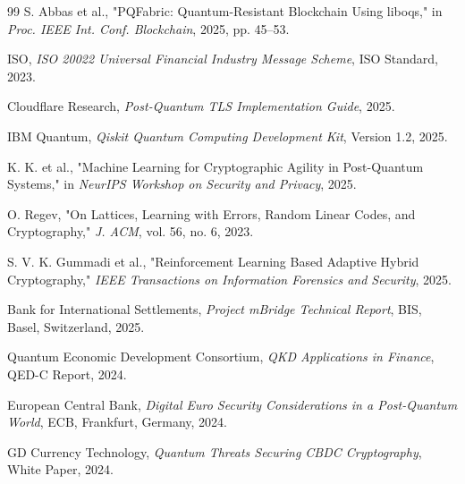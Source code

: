 \documentclass[pdflatex,sn-basic,english]{sn-jnl}
\begin{document}
\begin{thebibliography}{99}
S. Abbas et al., "PQFabric: Quantum-Resistant Blockchain Using liboqs," in \emph{Proc. IEEE Int. Conf. Blockchain}, 2025, pp. 45--53.

ISO, \emph{ISO 20022 Universal Financial Industry Message Scheme}, ISO Standard, 2023.

Cloudflare Research, \emph{Post-Quantum TLS Implementation Guide}, 2025.

IBM Quantum, \emph{Qiskit Quantum Computing Development Kit}, Version 1.2, 2025.

K. K. et al., "Machine Learning for Cryptographic Agility in Post-Quantum Systems," in \emph{NeurIPS Workshop on Security and Privacy}, 2025.

O. Regev, "On Lattices, Learning with Errors, Random Linear Codes, and Cryptography," \emph{J. ACM}, vol. 56, no. 6, 2023.

S. V. K. Gummadi et al., "Reinforcement Learning Based Adaptive Hybrid Cryptography," \emph{IEEE Transactions on Information Forensics and Security}, 2025.

Bank for International Settlements, \emph{Project mBridge Technical Report}, BIS, Basel, Switzerland, 2025.

Quantum Economic Development Consortium, \emph{QKD Applications in Finance}, QED-C Report, 2024.

European Central Bank, \emph{Digital Euro Security Considerations in a Post-Quantum World}, ECB, Frankfurt, Germany, 2024.

GD Currency Technology, \emph{Quantum Threats Securing CBDC Cryptography}, White Paper, 2024.

\end{thebibliography}
\end{document}
